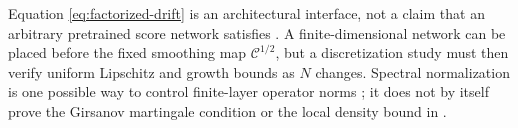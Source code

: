 \begin{remark}
Equation \eqref{eq:factorized-drift} is an architectural interface,
not a claim that an arbitrary pretrained score network satisfies
.  A finite-dimensional network can be placed before
the fixed smoothing map $\mathcal C^{1/2}$, but a discretization study
must then verify uniform Lipschitz and growth bounds as $N$ changes.
Spectral normalization is one possible way to control finite-layer
operator norms \citep{miyato2018spectral}; it does not by itself prove
the Girsanov martingale condition or the local density bound in
.
\end{remark}
